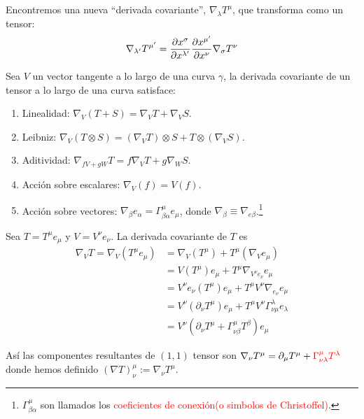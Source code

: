 \documentclass[../main]{subfiles}
\begin{document}
Encontremos una nueva ``derivada covariante'', $\nabla_{\lambda}T^{\mu}$, que transforma como un tensor:
\begin{equation}
    \nabla_{\lambda'}T^{\mu'}=\pdv{x^{\sigma}}{x^{\lambda'}}\pdv{x^{\mu'}}{x^{\nu}}\nabla_{\sigma}T^{\nu}
\end{equation}

Sea $V$ un vector tangente a lo largo de una curva $\gamma$, la derivada covariante de un tensor a lo largo de una curva satisface:
\begin{enumerate}
    \item Linealidad: $\nabla_{V}(T+S)=\nabla_{V} T+\nabla_{V} S$.
    \item Leibniz: $\nabla_{V}(T\otimes S)=(\nabla_{V}T)\otimes S+T\otimes(\nabla_{V} S)$.
    \item Aditividad: $\nabla_{fV+gW} T=f\nabla_{V}T+g\nabla_{W}S$.
    \item Acción sobre escalares: $\nabla_V(f)=V(f)$.
    \item Acción sobre vectores: $\nabla_{\beta}e_{\alpha}=\Gamma^{\mu}_{\beta\alpha} e_{\mu}$, donde $\nabla_{\beta} \equiv \nabla_{e\beta}$.\footnote{$\Gamma^{\mu}_{\beta\alpha}$ son llamados los \textcolor{red}{coeficientes de conexión(o simbolos de Christoffel)}.}
\end{enumerate}

Sea $T=T^{\mu}e_{\mu}$ y $V=V^{\nu} e_{\nu}$. La derivada covariante de $T$ es 
\begin{equation}
    \begin{split}
        \nabla_V T=\nabla_V (T^{\mu}e_{\mu})&=\nabla_V (T^{\mu})+T^{\mu}(\nabla_V e_{\mu})\\
        &=V(T^{\mu})e_{\mu}+T^{\mu}\nabla_{V^{\nu}e_{\nu}}e_{\mu}\\
        &=V^{\nu}e_{\nu}(T^{\mu})e_{\mu}+T^{\mu}V^{\nu}\nabla_{e_{\nu}}e_{\mu}\\
        &=V^{\nu}(\partial_{\nu}T^{\mu})e_{\mu}+T^{\mu}V^{\nu}\Gamma^{\lambda}_{\nu\mu}e_{\lambda}\\
        &=V^{\nu}(\partial_{\nu}T^{\mu}+\Gamma^{\mu}_{\nu\beta}T^{\beta})e_{\mu}
    \end{split}
\end{equation}

Así las componentes resultantes de $(1, 1)$ tensor son $\nabla_{\nu} T^{\mu}=\partial_{\mu} T^{\mu}+\textcolor{red}{\Gamma^{\mu}_{\nu\lambda} T^{\lambda}}$ donde hemos definido $(\nabla T)^{\mu}_{\nu}:=\nabla_{\nu} T^{\mu}$.
\end{document}
